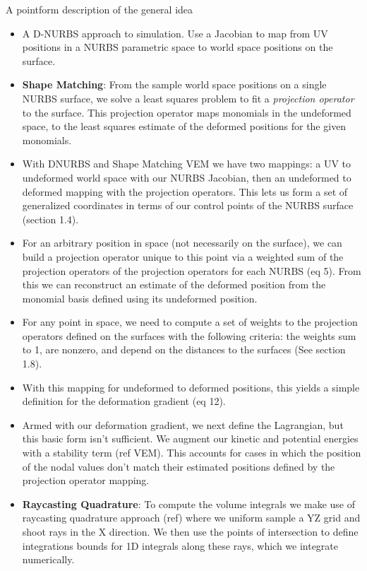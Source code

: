 A pointform description of the general idea
\begin{itemize}
	\item A D-NURBS approach to simulation. Use a Jacobian to map from UV positions in a NURBS parametric space to world space positions on the surface. 
	\item \textbf{Shape Matching}: From the sample world space positions on a single NURBS surface, we solve a least squares problem to fit a \textit{projection operator} to the surface. This projection operator maps monomials in the undeformed space, to the least squares estimate of the deformed positions for the given monomials.
	\item With DNURBS and Shape Matching VEM we have two mappings: a UV to undeformed world space with our NURBS Jacobian, then an undeformed to deformed mapping with the projection operators. This lets us form a set of generalized coordinates in terms of our control points of the NURBS surface (section 1.4).
	\item For an arbitrary position in space (not necessarily on the surface), we can build a projection operator unique to this point via a weighted sum of the projection operators of the projection operators for each NURBS (eq 5). From this we can reconstruct an estimate of the deformed position from the monomial basis defined using its undeformed position.
	\item For any point in space, we need to compute a set of weights to the projection operators defined on the surfaces with the following criteria: the weights sum to 1, are nonzero, and depend on the distances to the surfaces (See section 1.8).
	\item With this mapping for undeformed to deformed positions, this yields a simple definition for the deformation gradient (eq 12).
	\item Armed with our deformation gradient, we next define the Lagrangian, but this basic form isn't sufficient. We augment our kinetic and potential energies with a stability term (ref VEM). This accounts for cases in which the position of the nodal values don't match their estimated positions defined by the projection operator mapping.
	\item \textbf{Raycasting Quadrature}: To compute the volume integrals we make use of raycasting quadrature approach (ref) where we uniform sample a YZ grid and shoot rays in the X direction. We then use the points of intersection to define integrations bounds for 1D integrals along these rays, which we integrate numerically.

\end{itemize}
